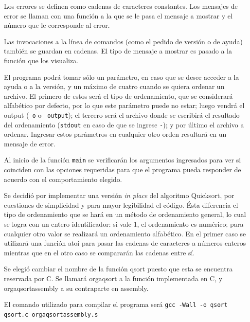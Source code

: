 \documentclass[a4paper, 12pt]{article}
\begin{document}
		Los errores se definen como cadenas de caracteres constantes. Los mensajes de error se llaman con una función a la que se le pasa el mensaje a mostrar y el número que le corresponde al error.
		
		Las invocaciones a la línea de comandos (como el pedido de versión o de ayuda) también se guardan en cadenas. El tipo de mensaje a mostrar es pasado a la función que los visualiza.
		
		El programa podrá tomar sólo un parámetro, en caso que se desee acceder a la ayuda o a la versión, y un máximo de cuatro cuando se quiera ordenar un archivo. El primero de estos será el tipo de ordenamiento, que se considerará alfabético por defecto, por lo que este parámetro puede no estar; luego vendrá el output (\texttt{-o} o \texttt{--output}); el tercero será el archivo donde se escribirá el resultado del ordenamiento (\texttt{stdout} en caso de que se ingrese \texttt{-}); y por último el archivo a ordenar. Ingresar estos parámetros en cualquier otro orden resultará en un mensaje de error.
		
		Al inicio de la función \texttt{main} se verificarán los argumentos ingresados para ver si coinciden con las opciones requeridas para que el programa pueda responder de acuerdo con el comportamiento elegido.
		
		Se decidió por implementar una versión \textit{in place} del algoritmo Quicksort, por cuestiones de simplicidad y para mayor legibilidad el código. Ésta diferencia el tipo de ordenamiento que se hará en un método de ordenamiento general, lo cual se logra con un entero identificador: si vale 1, el ordenamiento es numérico; para cualquier otro valor se realizará un ordenamiento alfabético. En el primer caso se utilizará una función atoi para pasar las cadenas de caracteres a números enteros mientras que en el otro caso se compararán las cadenas entre sí. 
		
		Se elegió cambiar el nombre de la función qsort puesto que esta se encuentra reservada por C. Se llamará orgaqsort a la función implementada en C, y orgaqsortassembly a su contraparte en assembly.
		
		El comando utilizado para compilar el programa será \texttt{gcc -Wall -o qsort qsort.c orgaqsortassembly.s} 
\end{document}
